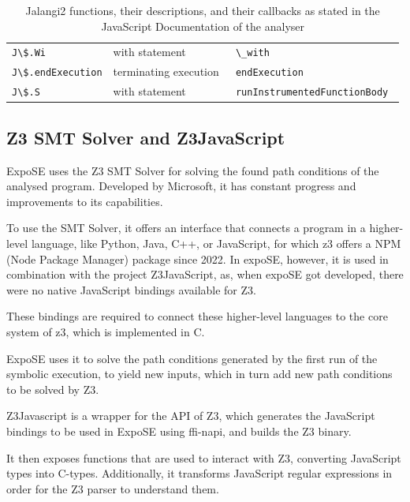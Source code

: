 \begin{table}[h]
{\begin{tabular}{l|l|l}
		{\lstinline|J\$.Wi          |} & with statement                                        &\lstinline| \_with                      |            \\
		{\lstinline|J\$.endExecution|} & terminating execution                                 &\lstinline| endExecution                |            \\
		{\lstinline|J\$.S           |} & with statement                                        &\lstinline| runInstrumentedFunctionBody |            \\
	\end{tabular}}
	\caption{Jalangi2  functions, their descriptions, and their callbacks as stated in the JavaScript Documentation of the analyser}
	\label{tab:jal-fun}
\end{table}

\FloatBarrier
\subsection{Z3 SMT Solver and Z3JavaScript}
\label{sec:z3}


ExpoSE uses the Z3 SMT Solver \cite{de_moura_z3_2008} for solving the found path conditions of the analysed program. Developed by Microsoft, it has constant progress and improvements to its capabilities.

To use the SMT Solver, it offers an interface that connects a program in a higher-level language, like Python, Java, C++, or JavaScript, for which z3 offers a NPM (Node Package Manager) package since 2022. In expoSE, however, it is used in combination with the project Z3JavaScript, as, when expoSE got developed, there were no native JavaScript bindings available for Z3. 

These bindings are required to connect these higher-level languages to the core system of z3, which is implemented in C.

ExpoSE uses it to solve the path conditions generated by the first run of the symbolic execution, to yield new inputs, which in turn add new path conditions to be solved by Z3. 


Z3Javascript is a wrapper for the API of Z3, which generates the JavaScript bindings to be used in ExpoSE using ffi-napi, and builds the Z3 binary.

It then exposes functions that are used to interact with Z3, converting JavaScript types into C-types. 
Additionally, it transforms JavaScript regular expressions in order for the Z3 parser to understand them.






